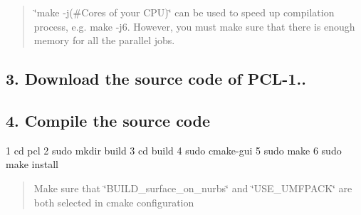 \begin{quote}
\char`\"{}make -\/j(\#\+Cores of your C\+P\+U)\char`\"{} can be used to speed up compilation process, e.\+g. make -\/j6. However, you must make sure that there is enough memory for all the parallel jobs. \end{quote}


\subsection*{3. Download the source code of P\+C\+L-\/1..}

\subsection*{4. Compile the source code}


\begin{DoxyCode}
1 cd pcl
2 sudo mkdir build
3 cd build
4 sudo cmake-gui
5 sudo make
6 sudo make install
\end{DoxyCode}


\begin{quote}
Make sure that \char`\"{}\+B\+U\+I\+L\+D\+\_\+surface\+\_\+on\+\_\+nurbs\char`\"{} and \char`\"{}\+U\+S\+E\+\_\+\+U\+M\+F\+P\+A\+C\+K\char`\"{} are both selected in cmake configuration\end{quote}
